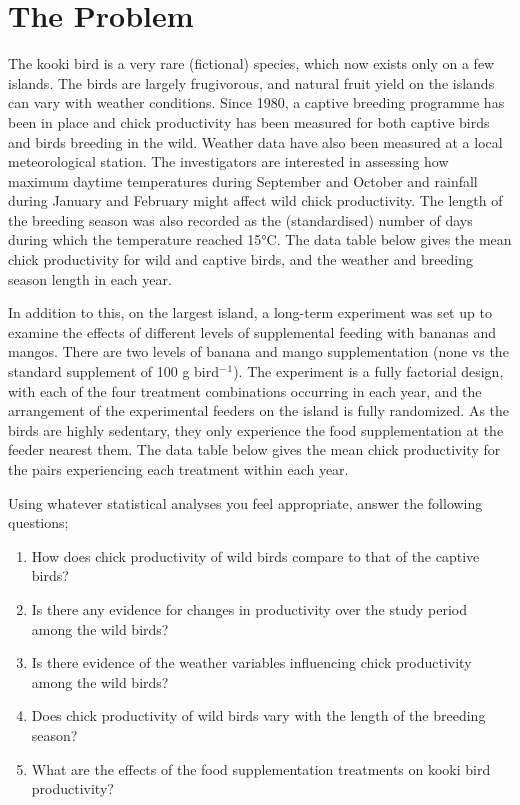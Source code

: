 \documentclass[
]{book}
\providecommand{\tightlist}{%
  \setlength{\itemsep}{0pt}\setlength{\parskip}{0pt}}
\begin{document}
\hypertarget{the-problem}{%
\section{The Problem}\label{the-problem}}

The kooki bird is a very rare (fictional) species, which now exists only on a few islands. The birds are largely frugivorous, and natural fruit yield on the islands can vary with weather conditions. Since 1980, a captive breeding programme has been in place and chick productivity has been measured for both captive birds and birds breeding in the wild. Weather data have also been measured at a local meteorological station. The investigators are interested in assessing how maximum daytime temperatures during September and October and rainfall during January and February might affect wild chick productivity. The length of the breeding season was also recorded as the (standardised) number of days during which the temperature reached 15°C. The data table below gives the mean chick productivity for wild and captive birds, and the weather and breeding season length in each year.

In addition to this, on the largest island, a long-term experiment was set up to examine the effects of different levels of supplemental feeding with bananas and mangos. There are two levels of banana and mango supplementation (none vs the standard supplement of 100 g bird\(^-\)\(^1\)). The experiment is a fully factorial design, with each of the four treatment combinations occurring in each year, and the arrangement of the experimental feeders on the island is fully randomized. As the birds are highly sedentary, they only experience the food supplementation at the feeder nearest them. The data table below gives the mean chick productivity for the pairs experiencing each treatment within each year.

Using whatever statistical analyses you feel appropriate, answer the following questions;

\begin{enumerate}
\def\labelenumi{\arabic{enumi})}
\tightlist
\item
  How does chick productivity of wild birds compare to that of the captive birds?
\item
  Is there any evidence for changes in productivity over the study period among the wild birds?\\
\item
  Is there evidence of the weather variables influencing chick productivity among the wild birds?
\item
  Does chick productivity of wild birds vary with the length of the breeding season?
\item
  What are the effects of the food supplementation treatments on kooki bird productivity?
\end{enumerate}
\end{document}
